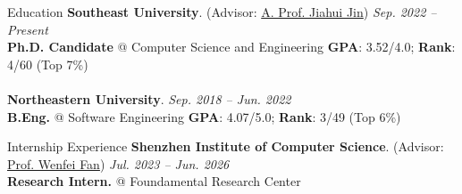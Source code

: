 \documentclass{cv} %
\newcommand{\mei}{\end{myitemize}\vspace{0.6ex}}
\begin{document}
\begin{rSection}[MITRed]{Education}
{\textbf{Southeast University}. (Advisor: \href{https://jujuhoo.github.io/}{A. Prof. Jiahui Jin})} \hfill {\em Sep. 2022 -- Present} 
\\ \textbf{Ph.D. Candidate} @ Computer Science and Engineering
\hfill { \textbf{GPA}: 3.52/4.0; \textbf{Rank}: 4/60 (Top 7\%)}
\\\\
{\textbf{Northeastern University}.} \hfill {\em Sep. 2018 -- Jun. 2022} 
\\ \textbf{B.Eng.} @ Software Engineering
\hfill { \textbf{GPA}: 4.07/5.0; \textbf{Rank}: 3/49 (Top 6\%)}
\end{rSection}

\begin{rSection}[MITRed]{Internship Experience}
{\bf Shenzhen Institute of Computer Science}. (Advisor: \href{https://homepages.inf.ed.ac.uk/wenfei/}{Prof. Wenfei Fan}) \hfill {\em Jul. 2023 -- Jun. 2026}\\
{\bf Research Intern.} @ Foundamental Research Center
\end{rSection}


\end{document}
